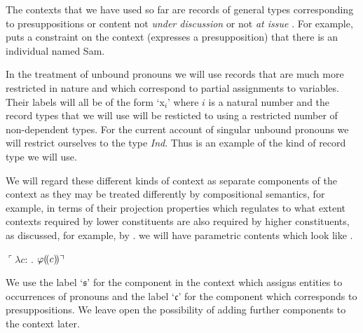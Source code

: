 The
contexts that we have used so far are records of general types corresponding to presuppositions
\citep{BeaverGeurts2014} or content not \textit{under discussion}
\citep{Ginzburg1994,Ginzburg2012}  or not \textit{at issue}
\citep{Potts2005}.  For example, \nexteg{} puts a constraint on the
context (expresses a presupposition) that there is an individual named
Sam.
\begin{ex} 
\end{ex} 
In the treatment of unbound pronouns we will use records that are much
more restricted in nature and which correspond to partial assignments to 
variables.  Their labels will all be of the form `x$_i$' where $i$ is
a natural number and the record types that we will use will be
resticted to using a restricted number of non-dependent types. For the
current account of singular unbound pronouns we will restrict
ourselves to the type \textit{Ind}.  Thus \nexteg{} is an example of
the kind of record type we will use.
\begin{ex} 
\end{ex} 
  
We will regard these different kinds of
context as separate components of the context as they may be treated differently by compositional
semantics, for example, in terms of their projection properties which
regulates to what extent contexts required by lower constituents are
also required by higher constituents, as discussed, for example, by
\cite{Potts2005}.  we will have parametric
contents which look like \nexteg{}.
\begin{ex} 
$\ulcorner\lambda c$: . $\varphi(\!(c)\!)\urcorner$ 
\end{ex}

We use the label `$\mathfrak{s}$' for the component in the context which
assigns entities to occurrences of pronouns and the label
`$\mathfrak{c}$' for the component which corresponds to
presuppositions.  We leave open the possibility of adding further
components to the context later.

